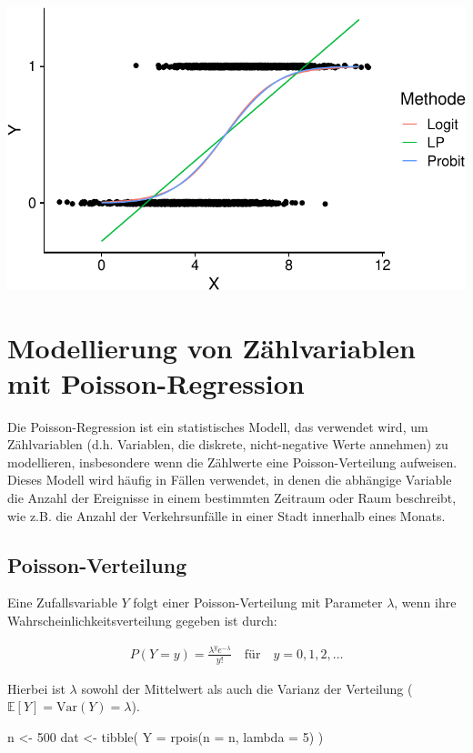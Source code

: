 \documentclass[
  a4paper,
  DIV=11,
  oneside]{scrreprt}
\newenvironment{Shaded}{\begin{snugshade}}{\end{snugshade}}
\newcommand{\AttributeTok}[1]{\textcolor[rgb]{0.40,0.45,0.13}{#1}}
\newcommand{\DecValTok}[1]{\textcolor[rgb]{0.68,0.00,0.00}{#1}}
\newcommand{\FunctionTok}[1]{\textcolor[rgb]{0.28,0.35,0.67}{#1}}
\newcommand{\NormalTok}[1]{\textcolor[rgb]{0.00,0.23,0.31}{#1}}
\newcommand{\OtherTok}[1]{\textcolor[rgb]{0.00,0.23,0.31}{#1}}
\begin{document}
\includegraphics{Reg_files/figure-pdf/unnamed-chunk-10-1.pdf}

\section{Modellierung von Zählvariablen mit
Poisson-Regression}\label{sec-poissonreg}

Die Poisson-Regression ist ein statistisches Modell, das verwendet wird,
um Zählvariablen (d.h. Variablen, die diskrete, nicht-negative Werte
annehmen) zu modellieren, insbesondere wenn die Zählwerte eine
Poisson-Verteilung aufweisen. Dieses Modell wird häufig in Fällen
verwendet, in denen die abhängige Variable die Anzahl der Ereignisse in
einem bestimmten Zeitraum oder Raum beschreibt, wie z.B. die Anzahl der
Verkehrsunfälle in einer Stadt innerhalb eines Monats.

\subsection{Poisson-Verteilung}\label{poisson-verteilung}

Eine Zufallsvariable \(Y\) folgt einer Poisson-Verteilung mit Parameter
\(\lambda\), wenn ihre Wahrscheinlichkeitsverteilung gegeben ist durch:

\begin{align}
P(Y = y) = \frac{\lambda^y e^{-\lambda}}{y!} \quad \text{für} \quad y = 0, 1, 2, \ldots
\end{align}

Hierbei ist \(\lambda\) sowohl der Mittelwert als auch die Varianz der
Verteilung (\(\mathbb{E}[Y] = \text{Var}(Y) = \lambda\)).

\begin{Shaded}
\begin{Highlighting}[]
\NormalTok{n }\OtherTok{\textless{}{-}} \DecValTok{500}
\NormalTok{dat }\OtherTok{\textless{}{-}} \FunctionTok{tibble}\NormalTok{(}
  \AttributeTok{Y =} \FunctionTok{rpois}\NormalTok{(}\AttributeTok{n =}\NormalTok{ n, }\AttributeTok{lambda =} \DecValTok{5}\NormalTok{)}
\NormalTok{)}
\end{Highlighting}
\end{Shaded}
\end{document}
